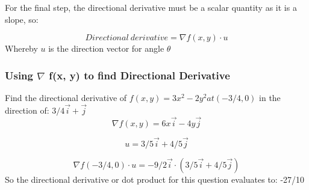 \documentclass{article}
\begin{document}
For the final step, the directional derivative must be a scalar quantity as it is a slope, so:

\begin{equation}
Directional\ derivative = \nabla f(x,y)\cdot u
\end{equation}
Whereby $u$ is the direction vector for angle $\theta$\\


\subsubsection{Using $\nabla$ f(x, y) to find Directional Derivative}
Find the directional derivative of $f(x,y) = 3x^2 - 2y^2 at (-3/4, 0)$ in the direction of:
$3/4\vec{i}+\vec{j}$\\

\begin{equation}
\nabla f(x,y) = 6x\vec{i}-4y\vec{j}
\end{equation}

\begin{equation}
u = 3/5\vec{i}+4/5\vec{j}
\end{equation}

\begin{equation}
\nabla f(-3/4, 0)\cdot u = -9/2\vec{i}\cdot(3/5\vec{i}+4/5\vec{j})
\end{equation}
So the directional derivative or dot product for this question evaluates to: -27/10\\
\end{document}
